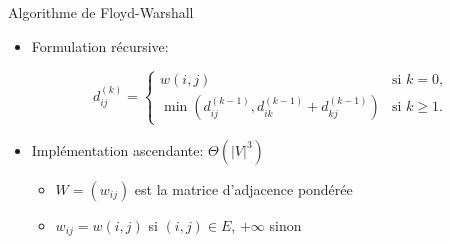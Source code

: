 \begin{frame}{Algorithme de Floyd-Warshall}

\begin{itemize}
\item Formulation récursive:

\[d_{ij}^{(k)}=\left\{ \begin{array}{ll}
w(i,j)&\mbox{si }k=0,\\
\min(d_{ij}^{(k-1)},d_{ik}^{(k-1)}+d_{kj}^{(k-1)}) & \mbox{si } k\geq 1.
\end{array}\right.\]

\item Implémentation ascendante: $\Theta(|V|^3)$
\begin{itemize}
\item $W=(w_{ij})$ est la matrice d'adjacence pondérée
\item $w_{ij}=w(i,j)$ si $(i,j)\in E$, $+\infty$ sinon
\end{itemize}

\begin{center}
{\small
{}
}
\end{center}


\end{itemize}


\end{frame}


